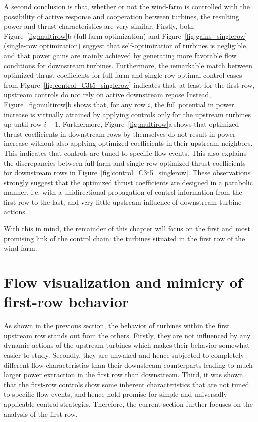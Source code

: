 	A second conclusion is that, whether or not the wind-farm is controlled with the possibility of active response and cooperation between turbines, the resulting power and thrust characteristics are very similar. Firstly, both Figure~\ref{fig:multirow}b (full-farm optimization) and Figure~\ref{fig:gains_singlerow} (single-row optimization) suggest that self-optimization of turbines is negligible, and that power gains are mainly achieved by generating more favorable flow conditions for downstream turbines. Furthermore, the remarkable match between optimized thrust coefficients for full-farm and single-row optimal control cases from Figure~\ref{fig:control_C3t5_singlerow} indicates that, at least for the first row, upstream controls do not rely on active downstream repose Instead, Figure~\ref{fig:multirow}b shows that, for any row $i$, the full potential in power increase is virtually attained by applying controls only for the upstream turbines up until row $i-1$. Furthermore, Figure~\ref{fig:multirow}a shows that optimized thrust coefficients in downstream rows by themselves do not result in power increase without also applying optimized coefficients in their upstream neighbors. This indicates that controls are tuned to specific flow events. This also explains the discrepancies between full-farm and single-row optimized thrust coefficients for downstream rows in Figure~\ref{fig:control_C3t5_singlerow}. 
    These observations strongly suggest that the optimized thrust coefficients are designed in a parabolic manner, i.e. with a unidirectional propagation of control information from the first row to the last, and very little upstream influence of downstream turbine actions.
    
    With this in mind, the remainder of this chapter will focus on the first and most promising link of the control chain: the turbines situated in the first row of the wind farm.

\section{Flow visualization and mimicry of first-row behavior}\label{sec:analysis_flow_vis}
As shown in the previous section, the behavior of turbines within the first upstream row stands out from the others. Firstly, they are not influenced by any dynamic actions of the upstream turbines which makes their behavior somewhat easier to study. Secondly, they are unwaked and hence subjected to completely different flow characteristics than their downstream counterparts leading to much larger power extraction in the first row than downstream. Third, it was shown that the first-row controls show some inherent characteristics that are not tuned to specific flow events, and hence hold promise for simple and universally applicable control strategies. Therefore, the current section further focuses on the analysis of the first row. 

